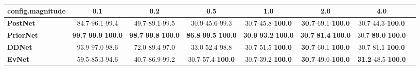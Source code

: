 \begin{tabular}{lccccccc}
\toprule
\textbf{config.magnitude} &                                         0.1 &                                         0.2 &                                         0.5 &                                         1.0 &                                         2.0 &                                4.0 \\
\midrule
\textbf{PostNet } &                              84.7-96.1-99.4 &                              49.7-89.1-99.5 &                              30.9-45.6-99.3 &                    30.7-45.8-\textbf{100.0} &           \textbf{30.7}-69.1-\textbf{100.0} &           30.7-44.3-\textbf{100.0} \\
\textbf{PriorNet} &  \textbf{99.7}-\textbf{99.9}-\textbf{100.0} &  \textbf{98.7}-\textbf{99.8}-\textbf{100.0} &  \textbf{86.8}-\textbf{99.5}-\textbf{100.0} &  \textbf{30.9}-\textbf{93.2}-\textbf{100.0} &  \textbf{30.7}-\textbf{81.4}-\textbf{100.0} &  30.7-\textbf{89.0}-\textbf{100.0} \\
\textbf{DDNet   } &                              93.9-97.0-98.6 &                              72.0-89.4-97.0 &                              33.0-52.4-98.8 &                    30.7-51.5-\textbf{100.0} &           \textbf{30.7}-60.1-\textbf{100.0} &           30.7-81.1-\textbf{100.0} \\
\textbf{EvNet   } &                              59.5-85.3-94.6 &                              40.7-86.9-99.2 &                    30.7-57.4-\textbf{100.0} &                    30.7-39.2-\textbf{100.0} &           \textbf{30.7}-49.0-\textbf{100.0} &  \textbf{31.2}-48.5-\textbf{100.0} \\
\bottomrule
\end{tabular}
